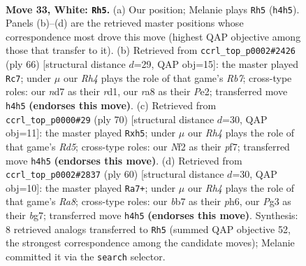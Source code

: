 \documentclass[11pt]{article}
\begin{document}
\clearpage

\begin{figure}[p]\centering
\begin{subfigure}{0.46\textwidth}\centering
\resizebox{\linewidth}{!}{%
\newchessgame
\chessboard[
  setfen={r7/1b1n2k1/8/3p4/p6R/P5P1/1PP2N2/2K5 w - - 0 33},
  showmover=false,
  pgfstyle=straightmove, color=movearrow, markmove={h4-h5}
]}
\caption{}
\end{subfigure}\hfill
\begin{subfigure}{0.46\textwidth}\centering
\resizebox{\linewidth}{!}{%
\newchessgame
\chessboard[
  setfen={2N2k2/1R4pp/5p2/5P2/2n5/5P2/4PK1P/3r4 w - - 3 34},
  showmover=false,
  pgfstyle=straightmove, color=movearrow, markmove={b7-c7}
]}
\caption{}
\end{subfigure}
\\[4pt]
\begin{subfigure}{0.46\textwidth}\centering
\resizebox{\linewidth}{!}{%
\newchessgame
\chessboard[
  setfen={8/4kp2/p7/1p1R3p/4PK1P/P4P2/1r6/8 w - - 0 36},
  showmover=false,
  pgfstyle=straightmove, color=movearrow, markmove={d5-h5}
]}
\caption{}
\end{subfigure}\hfill
\begin{subfigure}{0.46\textwidth}\centering
\resizebox{\linewidth}{!}{%
\newchessgame
\chessboard[
  setfen={R7/4k1b1/7p/p1r2p2/8/5N1P/5PP1/6K1 w - - 0 31},
  showmover=false,
  pgfstyle=straightmove, color=movearrow, markmove={a8-a7}
]}
\caption{}
\end{subfigure}
\caption{\textbf{Move 33, White: \texttt{Rh5}.} (a) Our position; Melanie plays \texttt{Rh5} (\texttt{h4h5}). Panels (b)--(d) are the retrieved master positions whose correspondence most drove this move (highest QAP objective among those that transfer to it). (b) Retrieved from \texttt{ccrl\_top\_p0002\#2426} (ply 66) [structural distance $d$=29, QAP obj=15]: the master played \texttt{Rc7}; under $\mu$ our \emph{Rh4} plays the role of that game's \emph{Rb7}; cross-type roles: our \emph{n}d7 as their \emph{r}d1, our \emph{r}a8 as their \emph{P}e2; transferred move \texttt{h4h5} \textbf{(endorses this move)}. (c) Retrieved from \texttt{ccrl\_top\_p0000\#29} (ply 70) [structural distance $d$=30, QAP obj=11]: the master played \texttt{Rxh5}; under $\mu$ our \emph{Rh4} plays the role of that game's \emph{Rd5}; cross-type roles: our \emph{N}f2 as their \emph{p}f7; transferred move \texttt{h4h5} \textbf{(endorses this move)}. (d) Retrieved from \texttt{ccrl\_top\_p0002\#2837} (ply 60) [structural distance $d$=30, QAP obj=10]: the master played \texttt{Ra7+}; under $\mu$ our \emph{Rh4} plays the role of that game's \emph{Ra8}; cross-type roles: our \emph{b}b7 as their \emph{p}h6, our \emph{P}g3 as their \emph{b}g7; transferred move \texttt{h4h5} \textbf{(endorses this move)}. Synthesis: 8 retrieved analogs transferred to \texttt{Rh5} (summed QAP objective 52, the strongest correspondence among the candidate moves); Melanie committed it via the \texttt{search} selector.}
\label{fig:thought-m64}
\end{figure}
\end{document}
